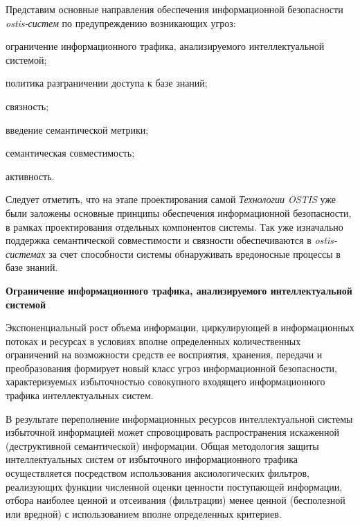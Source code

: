 \begin{SCn}
	\begin{scnindent}
	\end{scnindent}
\end{SCn}

Представим основные направления обеспечения информационной безопасности \textit{ostis-систем} по предупреждению возникающих угроз:

\begin{textitemize}
	\item ограничение информационного трафика, анализируемого интеллектуальной системой;
	\item политика разграничении доступа к базе знаний;
	\item связность;
	\item введение семантической метрики;
	\item семантическая совместимость;
	\item активность.
\end{textitemize}

Следует отметить, что на этапе проектирования самой \textit{Технологии OSTIS} уже были заложены основные принципы обеспечения информационной безопасности, в рамках проектирования отдельных компонентов системы. Так уже изначально поддержка семантической совместимости и связности обеспечиваются в \textit{ostis-системах} за счет способности системы обнаруживать вредоносные процессы в базе знаний.

\textbf{Ограничение информационного трафика, анализируемого интеллектуальной системой}

Экспоненциальный рост объема информации, циркулирующей в информационных потоках и ресурсах в условиях вполне определенных количественных ограничений на возможности средств ее восприятия, хранения, передачи и преобразования формирует новый класс угроз информационной безопасности, характеризуемых избыточностью совокупного входящего информационного трафика интеллектуальных систем.

В результате переполнение информационных ресурсов интеллектуальной системы избыточной информацией может спровоцировать распространения искаженной (деструктивной семантической) информации. Общая методология защиты интеллектуальных систем от избыточного информационного трафика осуществляется посредством использования аксиологических фильтров, реализующих функции численной оценки ценности поступающей информации, отбора наиболее ценной и отсеивания (фильтрации) менее ценной (бесполезной или вредной) с использованием вполне определенных критериев.

